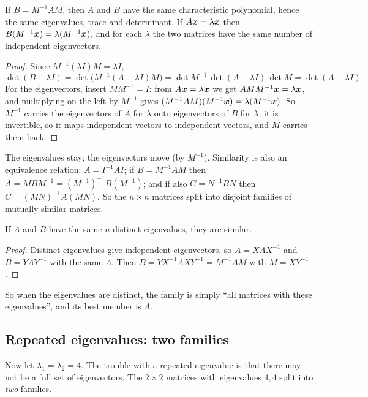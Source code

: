 \begin{theorem}\label{thm:u32-same}
If $B=M^{-1}AM$, then $A$ and $B$ have the same characteristic polynomial, hence the same
eigenvalues, trace and determinant. If $A\boldsymbol{x}=\lambda\boldsymbol{x}$ then $B(M^{-1}\boldsymbol{x})=\lambda(M^{-1}\boldsymbol{x})$, and
for each $\lambda$ the two matrices have the same number of independent eigenvectors.
\end{theorem}
\begin{proof}
Since $M^{-1}(\lambda I)M=\lambda I$,
\[
  \det(B-\lambda I)=\det\bigl(M^{-1}(A-\lambda I)M\bigr)=\det M^{-1}\,\det(A-\lambda I)\,\det M=\det(A-\lambda I).
\]
For the eigenvectors, insert $MM^{-1}=I$: from $A\boldsymbol{x}=\lambda\boldsymbol{x}$ we get $AMM^{-1}\boldsymbol{x}=\lambda\boldsymbol{x}$, and
multiplying on the left by $M^{-1}$ gives $(M^{-1}AM)(M^{-1}\boldsymbol{x})=\lambda(M^{-1}\boldsymbol{x})$. So $M^{-1}$
carries the eigenvectors of $A$ for $\lambda$ onto eigenvectors of $B$ for $\lambda$; it is
invertible, so it maps independent vectors to independent vectors, and $M$ carries them back.
\end{proof}

The eigenvalues stay; the eigenvectors move (by $M^{-1}$). Similarity is also an equivalence
relation: $A=I^{-1}AI$; if $B=M^{-1}AM$ then $A=MBM^{-1}=(M^{-1})^{-1}B(M^{-1})$; and if also
$C=N^{-1}BN$ then $C=(MN)^{-1}A(MN)$. So the $n\times n$ matrices split into disjoint families of
mutually similar matrices.

\begin{corollary}\label{cor:u32-distinct}
If $A$ and $B$ have the same $n$ distinct eigenvalues, they are similar.
\end{corollary}
\begin{proof}
Distinct eigenvalues give independent eigenvectors, so $A=X\Lambda X^{-1}$ and $B=Y\Lambda Y^{-1}$
with the same $\Lambda$. Then $B=Y X^{-1}AXY^{-1}=M^{-1}AM$ with $M=XY^{-1}$.
\end{proof}

So when the eigenvalues are distinct, the family is simply ``all matrices with these
eigenvalues'', and its best member is $\Lambda$.

\subsection{Repeated eigenvalues: two families}

Now let $\lambda_1=\lambda_2=4$. The trouble with a repeated eigenvalue is that there may not be a
full set of eigenvectors. The $2\times2$ matrices with eigenvalues $4,4$ split into \emph{two}
families.

